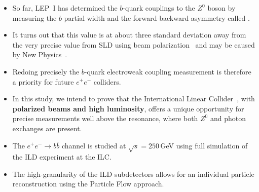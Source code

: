 

\begin{itemize}
	\item So far, LEP~I has determined the $b$-quark couplings to the $Z^0$ boson by measuring the $b$ partial width and the forward-backward asymmetry called \afb.
	\item It turns out that this value is at about three standard deviation away from the very precise value from SLD using beam polarization~\cite{bib:AfbSMFit} and may be caused by New Physics~\cite{bib:RSTOP}.
	\item Redoing precisely the $b$-quark electroweak coupling measurement is therefore a priority for future $e^+e^-$ colliders. 
	
\end{itemize}

\begin{itemize}
	
	\item In this study, we intend to prove that the International Linear Collider~\cite{bib:ILC}, with \textbf{polarized beams and high luminosity}, offers a unique opportunity for precise measurements well above the resonance, where both $Z^0$ and photon exchanges are present. 
	\item {\color{Blue} The $e^+ e^-\to b\bar{b}$ channel is studied at $\sqrt{s}=250$\,GeV using full simulation of the ILD experiment at the ILC.}
	\item The high-granularity of the ILD subdetectors allows for an individual particle reconstruction using the Particle Flow approach.
\end{itemize}


